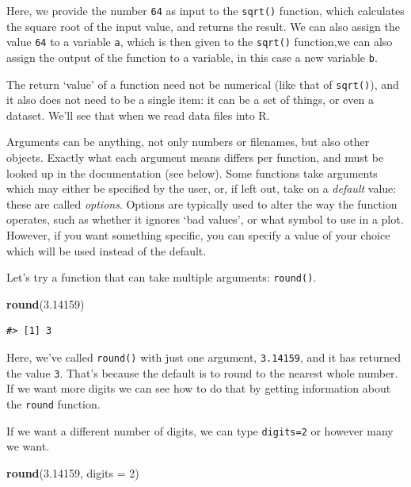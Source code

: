 \documentclass[
]{book}
\newenvironment{Shaded}{\begin{snugshade}}{\end{snugshade}}
\newcommand{\AttributeTok}[1]{\textcolor[rgb]{0.13,0.29,0.53}{#1}}
\newcommand{\DecValTok}[1]{\textcolor[rgb]{0.00,0.00,0.81}{#1}}
\newcommand{\FloatTok}[1]{\textcolor[rgb]{0.00,0.00,0.81}{#1}}
\newcommand{\FunctionTok}[1]{\textcolor[rgb]{0.13,0.29,0.53}{\textbf{#1}}}
\newcommand{\NormalTok}[1]{#1}
\begin{document}
Here, we provide the number \texttt{64} as input to the \texttt{sqrt()} function, which
calculates the square root of the input value, and returns the result. We can also assign the value \texttt{64} to a variable \texttt{a}, which is then given to the \texttt{sqrt()} function,we can also assign the output of the function to a variable, in this case a new variable \texttt{b}.

The return `value' of a function need not be numerical (like that of \texttt{sqrt()}),
and it also does not need to be a single item: it can be a set of things, or
even a dataset. We'll see that when we read data files into R.

Arguments can be anything, not only numbers or filenames, but also other
objects. Exactly what each argument means differs per function, and must be
looked up in the documentation (see below). Some functions take arguments which
may either be specified by the user, or, if left out, take on a \emph{default} value:
these are called \emph{options}. Options are typically used to alter the way the
function operates, such as whether it ignores `bad values', or what symbol to
use in a plot. However, if you want something specific, you can specify a value
of your choice which will be used instead of the default.

Let's try a function that can take multiple arguments: \texttt{round()}.

\begin{Shaded}
\begin{Highlighting}[]
\FunctionTok{round}\NormalTok{(}\FloatTok{3.14159}\NormalTok{)}
\end{Highlighting}
\end{Shaded}

\begin{verbatim}
#> [1] 3
\end{verbatim}

Here, we've called \texttt{round()} with just one argument, \texttt{3.14159}, and it has
returned the value \texttt{3}. That's because the default is to round to the nearest
whole number. If we want more digits we can see how to do that by getting
information about the \texttt{round} function.

If we want a different number of digits, we can
type \texttt{digits=2} or however many we want.

\begin{Shaded}
\begin{Highlighting}[]
\FunctionTok{round}\NormalTok{(}\FloatTok{3.14159}\NormalTok{, }\AttributeTok{digits =} \DecValTok{2}\NormalTok{)}
\end{Highlighting}
\end{Shaded}
\end{document}
